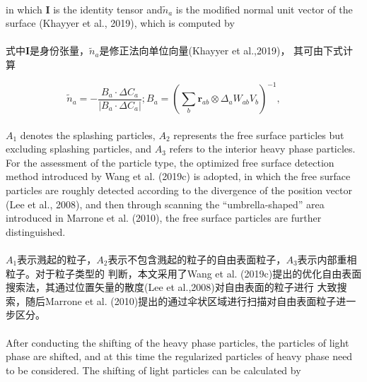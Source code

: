 \documentclass[UTF8]{ctexart}
\begin{document}
\paragraph{\quad}in which $\mathbf{I}$ is the identity tensor and$\tilde{n}_a$ is the modified normal 
                unit vector of the surface (Khayyer et al., 2019), which is computed by
\paragraph{\quad}式中$\mathbf{I}$是身份张量，$\tilde{n}_a$是修正法向单位向量(Khayyer et al.,2019)，
                其可由下式计算
            
\begin{equation}
   \tilde{n}_a = -\frac{B_a\cdot \Delta C_a }{|B_a \cdot \Delta C_a |};B_a = (\sum_{b}\mathbf{r}_{ab}\otimes\Delta_{a}W_{ab}V_b)^{-1}, \qquad 
\end{equation}

\paragraph{\quad}$A_1$ denotes the splashing particles, $A_2$ represents the free surface particles 
                but excluding splashing particles, and $A_3$ refers to the interior heavy phase 
                particles. For the assessment of the particle type, the optimized free surface 
                detection method introduced by Wang et al. (2019c) is adopted, in which the free 
                surface particles are roughly detected according to the divergence of the position 
                vector (Lee et al., 2008), and then through scanning the “umbrella-shaped” area 
                introduced in Marrone et al. (2010), the free surface particles are further distinguished.
\paragraph{\quad}$A_1$表示溅起的粒子，$A_2$表示不包含溅起的粒子的自由表面粒子，$A_3$表示内部重相粒子。对于粒子类型的
                判断，本文采用了Wang et al. (2019c)提出的优化自由表面搜索法，其通过位置矢量的散度(Lee et al.,2008)对自由表面的粒子进行
                大致搜索，随后Marrone et al. (2010)提出的通过伞状区域进行扫描对自由表面粒子进一步区分。

\paragraph{\quad}After conducting the shifting of the heavy phase particles, the particles 
                of light phase are shifted, and at this time the regularized particles of 
                heavy phase need to be considered. The shifting of light particles can be calculated by
\end{document}
